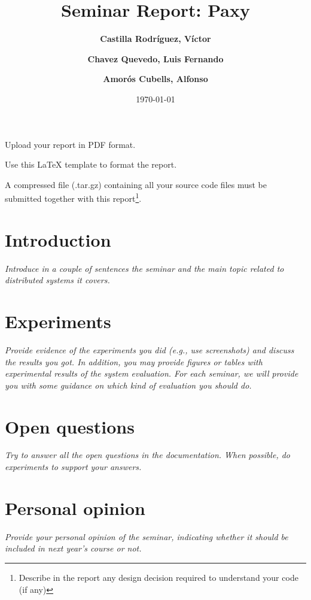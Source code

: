 \documentclass[a4paper, 10pt]{article}
\title{Seminar Report: Paxy}
\author{ \textbf{Castilla Rodríguez, Víctor} \and \textbf{Chavez Quevedo, Luis Fernando} \and \textbf{Amorós Cubells, Alfonso}
}
\date{\normalsize\today{}}
\begin{document}
\maketitle

\begin{center}
  Upload your report in PDF format.

  Use this LaTeX template to format the report.

	A compressed file (.tar.gz) containing all your source code files must be submitted together with this report\footnote{Describe in the report any design decision required to understand your code (if any)}.
\end{center}

\section{Introduction}

\textit{Introduce in a couple of sentences the seminar and the main topic related to distributed systems it covers.}

\section{Experiments}

\textit{Provide evidence of the experiments you did (e.g., use screenshots) and discuss the results you got. In addition, you may provide figures or tables with experimental results of the system evaluation. For each seminar, we will provide you with some guidance on which kind of evaluation you should do.}

\section{Open questions}

\textit{Try to answer all the open questions in the documentation. When possible, do experiments to support your answers.}

\section{Personal opinion}

\textit{Provide your personal opinion of the seminar, indicating whether it should be included in next year's course or not.}
\end{document}
